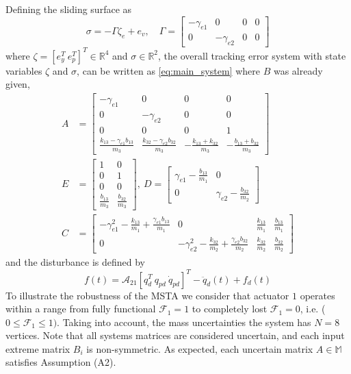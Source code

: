 \documentclass[twocolumn]{autarc_LH}
\begin{document}
Defining the sliding surface as
\begin{equation*}
    \sigma = -\Gamma \zeta_e + e_{v}, \quad \Gamma = \left[ \begin{array}{cccc}
        -\gamma_{e1} &  0 & 0 & 0 \\
         0 & -\gamma_{e2} & 0 & 0
    \end{array} \right]
\end{equation*}
where $\zeta = [e_y^T~e_p^T]^T \in \mathbb{R}^4 $ and $\sigma \in \mathbb{R}^2$, the overall tracking error system with state variables $\zeta$ and $\sigma$, can be written as \eqref{eq:main_system} where $B$ was already given,  
\begin{align*}
A & = \left[ \begin{array}{cccc} -\gamma_{e1} & 0 & 0 & 0 \\ 0 & -\gamma_{e2} & 0 & 0 \\ 0 & 0 & 0 & 1 \\ \frac{ k_{13}-\gamma_{e1}b_{13}}{m_3} & \frac{k_{32}-\gamma_{e2}b_{32}}{m_3} & -\frac{k_{13}+k_{32}}{m_3} & -\frac{b_{13}+b_{32}}{m_3}  \end{array} \right] \\
E & = \left[ \!\! \begin{array}{cc} 1 & 0 \\ 0 & 1 \\ 0 & 0 \\ \frac{b_{13}}{m_3} &  
\frac{b_{32}}{m_3} \end{array} \!\! \right], ~
D \!=\! \left[ \begin{array}{cc}
         \gamma_{e1}-\frac{b_{13}}{m_1} & 0 \\
         0 & \gamma_{e2}-\frac{b_{32}}{m_2} 
    \end{array} \right] \\
C & \!=\! \left[ \!\! \begin{array}{cccc}
         -\gamma_{e1}^2 \!-\! \frac{k_{13}}{m_1} \!+\! \frac{ \gamma_{e1} b_{13}}{m_1} & 0 & \frac{k_{13}}{m_1} & \frac{b_{13}}{m_1}  \\ 0 & -\gamma_{e2}^2 \!-\! \frac{k_{32}}{m_2} \!+\! \frac{ \gamma_{e2} b_{32}}{m_2} & \frac{k_{32}}{m_2} &  \frac{b_{32}}{m_2} \end{array} \!\! \right]
\end{align*}
and the disturbance is defined by 
\begin{equation*}
     f(t)  = \mathcal{A}_{21} \left[ q_d^T~q_{pd}~\dot{q}_{pd} \right]^T - \ddot{q}_d(t)  + f_d(t) 
\end{equation*}
To illustrate the robustness of the MSTA we consider that actuator $1$ operates within a range from fully functional $\mathcal{F}_1 \!=\! 1$ to completely lost $\mathcal{F}_1 = 0$, i.e. ( $0 \! \leq \! \mathcal{F}_1  \leq 1)$. Taking into account, the mass uncertainties the system has $N = 8$ vertices. Note that all systems matrices are considered uncertain, and each input extreme matrix $B_i$ is non-symmetric. As expected, each uncertain matrix $A \in \mathbb{M}$ satisfies Assumption (A2).
\end{document}
